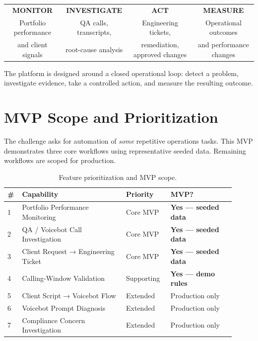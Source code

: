 \documentclass[11pt,a4paper]{article}
\begin{document}
\medskip
\begin{center}
\small
\renewcommand{\arraystretch}{1.4}
\begin{tabular}{c@{\quad$\rightarrow$\quad}c@{\quad$\rightarrow$\quad}c@{\quad$\rightarrow$\quad}c}
\textbf{MONITOR} & \textbf{INVESTIGATE} & \textbf{ACT} & \textbf{MEASURE} \\
\scriptsize Portfolio performance & \scriptsize QA calls, transcripts, & \scriptsize Engineering tickets, & \scriptsize Operational outcomes \\
\scriptsize and client signals & \scriptsize root-cause analysis & \scriptsize remediation, approved changes & \scriptsize and performance changes
\end{tabular}
\renewcommand{\arraystretch}{1}
\end{center}
\smallskip

The platform is designed around a closed operational loop: detect a problem, investigate evidence, take a controlled action, and measure the resulting outcome.

\section{MVP Scope and Prioritization}

The challenge asks for automation of \emph{some} repetitive operations tasks. This MVP demonstrates three core workflows using representative seeded data. Remaining workflows are scoped for production.

\begin{table}[H]
\centering
\small
\begin{tabular}{p{0.05\linewidth}p{0.42\linewidth}p{0.18\linewidth}p{0.26\linewidth}}
\toprule
\textbf{\#} & \textbf{Capability} & \textbf{Priority} & \textbf{MVP?} \\
\midrule
1 & Portfolio Performance Monitoring   & Core MVP           & \textbf{Yes — seeded data} \\
2 & QA / Voicebot Call Investigation    & Core MVP           & \textbf{Yes — seeded data} \\
3 & Client Request → Engineering Ticket & Core MVP           & \textbf{Yes — seeded data} \\
4 & Calling-Window Validation           & Supporting         & \textbf{Yes — demo rules} \\
5 & Client Script → Voicebot Flow       & Extended           & Production only \\
6 & Voicebot Prompt Diagnosis           & Extended           & Production only \\
7 & Compliance Concern Investigation    & Extended           & Production only \\
\bottomrule
\end{tabular}
\caption{Feature prioritization and MVP scope.}
\end{table}
\end{document}

